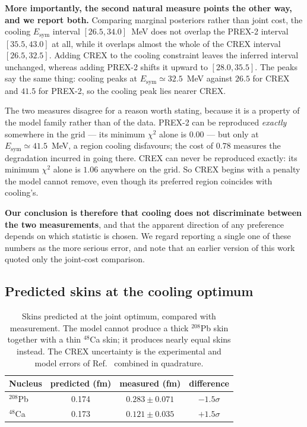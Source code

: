 \documentclass[aps,prc,twocolumn,showpacs,superscriptaddress,floatfix]{revtex4-2}
\newcommand{\Esym}{E_{\mathrm{sym}}}
\begin{document}
\textbf{More importantly, the second natural measure points the other way, and
we report both.} Comparing marginal posteriors rather than joint cost, the
cooling $\Esym$ interval $[26.5,34.0]$~MeV does not overlap the PREX-2 interval
$[35.5,43.0]$ at all, while it overlaps almost the whole of the CREX interval
$[26.5,32.5]$. Adding CREX to the cooling constraint leaves the inferred
interval unchanged, whereas adding PREX-2 shifts it upward to $[28.0,35.5]$.
The peaks say the same thing: cooling peaks at $\Esym \simeq 32.5$~MeV against
$26.5$ for CREX and $41.5$ for PREX-2, so the cooling peak lies nearer CREX.

The two measures disagree for a reason worth stating, because it is a property
of the model family rather than of the data. PREX-2 can be reproduced
\emph{exactly} somewhere in the grid --- its minimum $\chi^2$ alone is $0.00$
--- but only at $\Esym \simeq 41.5$~MeV, a region cooling disfavours; the cost
of $0.78$ measures the degradation incurred in going there. CREX can never be
reproduced exactly: its minimum $\chi^2$ alone is $1.06$ anywhere on the grid.
So CREX begins with a penalty the model cannot remove, even though its preferred
region coincides with cooling's.

\textbf{Our conclusion is therefore that cooling does not discriminate between
the two measurements}, and that the apparent direction of any preference depends
on which statistic is chosen. We regard reporting a single one of these numbers
as the more serious error, and note that an earlier version of this work quoted
only the joint-cost comparison.

\subsection{Predicted skins at the cooling optimum}

\begin{table}[t]
\caption{Skins predicted at the joint optimum, compared with measurement. The
model cannot produce a thick $^{208}$Pb skin together with a thin $^{48}$Ca
skin; it produces nearly equal skins instead. The CREX uncertainty is the
experimental and model errors of Ref.~\cite{CREX} combined in quadrature.}
\label{tab:pred}
\begin{ruledtabular}
\begin{tabular}{lccc}
Nucleus & predicted (fm) & measured (fm) & difference\\
\hline
$^{208}$Pb & 0.174 & $0.283\pm0.071$ \cite{PREX2} & $-1.5\sigma$\\
$^{48}$Ca  & 0.173 & $0.121\pm0.035$ \cite{CREX}  & $+1.5\sigma$\\
\end{tabular}
\end{ruledtabular}
\end{table}
\end{document}
